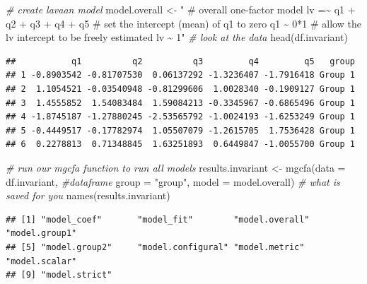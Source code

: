 \documentclass[
  man]{apa7}
\newenvironment{Shaded}{\begin{snugshade}}{\end{snugshade}}
\newcommand{\AttributeTok}[1]{\textcolor[rgb]{0.77,0.63,0.00}{#1}}
\newcommand{\CommentTok}[1]{\textcolor[rgb]{0.56,0.35,0.01}{\textit{#1}}}
\newcommand{\FunctionTok}[1]{\textcolor[rgb]{0.00,0.00,0.00}{#1}}
\newcommand{\NormalTok}[1]{#1}
\newcommand{\OtherTok}[1]{\textcolor[rgb]{0.56,0.35,0.01}{#1}}
\newcommand{\StringTok}[1]{\textcolor[rgb]{0.31,0.60,0.02}{#1}}
\begin{document}
\small

\begin{Shaded}
\begin{Highlighting}[]
\CommentTok{\# create lavaan model}
\NormalTok{model.overall }\OtherTok{\textless{}{-}} \StringTok{"}
\StringTok{\# overall one{-}factor model}
\StringTok{lv =\textasciitilde{} q1 + q2 + q3 + q4 + q5}
\StringTok{\# set the intercept (mean) of q1 to zero}
\StringTok{q1 \textasciitilde{} 0*1}
\StringTok{\# allow the lv intercept to be freely estimated}
\StringTok{lv \textasciitilde{} 1"}
\CommentTok{\# look at the data}
\FunctionTok{head}\NormalTok{(df.invariant)}
\end{Highlighting}
\end{Shaded}

\normalsize

\begin{verbatim}
##           q1          q2          q3         q4         q5   group
## 1 -0.8903542 -0.81707530  0.06137292 -1.3236407 -1.7916418 Group 1
## 2  1.1054521 -0.03540948 -0.81299606  1.0028340 -0.1909127 Group 1
## 3  1.4555852  1.54083484  1.59084213 -0.3345967 -0.6865496 Group 1
## 4 -1.8745187 -1.27880245 -2.53565792 -1.0024193 -1.6253249 Group 1
## 5 -0.4449517 -0.17782974  1.05507079 -1.2615705  1.7536428 Group 1
## 6  0.2278813  0.71348845  1.63251893  0.6449847 -1.0055700 Group 1
\end{verbatim}

\small

\begin{Shaded}
\begin{Highlighting}[]
\CommentTok{\# run our mgcfa function to run all models}
\NormalTok{results.invariant }\OtherTok{\textless{}{-}} \FunctionTok{mgcfa}\NormalTok{(}\AttributeTok{data =}\NormalTok{ df.invariant, }\CommentTok{\#dataframe}
                           \AttributeTok{group =} \StringTok{"group"}\NormalTok{, }
                           \AttributeTok{model =}\NormalTok{ model.overall)}
\CommentTok{\# what is saved for you}
\FunctionTok{names}\NormalTok{(results.invariant)}
\end{Highlighting}
\end{Shaded}

\normalsize

\begin{verbatim}
## [1] "model_coef"       "model_fit"        "model.overall"    "model.group1"    
## [5] "model.group2"     "model.configural" "model.metric"     "model.scalar"    
## [9] "model.strict"
\end{verbatim}
\end{document}
